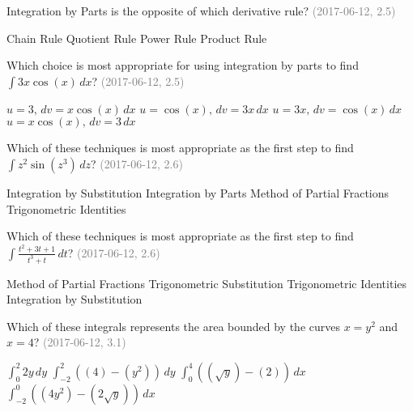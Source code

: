 \documentclass[12pt]{exam}
\newcommand{\questionDate}[1]{\textcolor{gray}{(#1)}}
\newcommand{\<}{\langle}
\renewcommand{\>}{\rangle}
\begin{document}
\begin{questions}
  \question
  Integration by Parts is the opposite of which derivative rule?
  \questionDate{2017-06-12, 2.5}
  \begin{choices}
    \choice Chain Rule
    \choice Quotient Rule
    \choice Power Rule
    \CorrectChoice Product Rule
  \end{choices}

  \question
  Which choice is most appropriate for using integration by parts
  to find \(\int 3x\cos(x)\,dx\)?
  \questionDate{2017-06-12, 2.5}
  \begin{choices}
    \choice \(u=3,\,dv=x\cos(x)\,dx\)
    \choice \(u=\cos(x),\,dv=3x\,dx\)
    \CorrectChoice \(u=3x,\,dv=\cos(x)\,dx\)
    \choice \(u=x\cos(x),\,dv=3\,dx\)
  \end{choices}

  \question
  Which of these techniques is most appropriate as the first step to find
  \(\int z^2\sin(z^3)\,dz\)?
  \questionDate{2017-06-12, 2.6}
  \begin{choices}
    \CorrectChoice
      Integration by Substitution
    \choice
      Integration by Parts
    \choice
      Method of Partial Fractions
    \choice
      Trigonometric Identities
  \end{choices}


  \newpage

  \question
  Which of these techniques is most appropriate as the first step to find
  \(\int \frac{t^2+3t+1}{t^3+t}\,dt\)?
  \questionDate{2017-06-12, 2.6}
  \begin{choices}
    \CorrectChoice
      Method of Partial Fractions
    \choice
      Trigonometric Substitution
    \choice
      Trigonometric Identities
    \choice
      Integration by Substitution
  \end{choices}


  \question
  Which of these integrals
  represents the area bounded by the curves \(x=y^2\) and \(x=4\)?
  \questionDate{2017-06-12, 3.1}
  \begin{choices}
    \choice
      \(\int_0^2 2y\,dy\)
    \CorrectChoice
      \(\int_{-2}^2((4)-(y^2))\,dy\)
    \choice
      \(\int_0^4((\sqrt y)-(2))\,dx\)
    \choice
      \(\int_{-2}^0((4y^2)-(2\sqrt y))\,dx\)
  \end{choices}


\end{questions}
\end{document}
